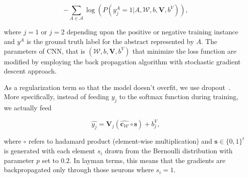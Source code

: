 \[- \sum_{A \in \mathcal{A}} \log(P(y_j^A = 1 | A, \mathcal{W}, b, \mathbf{V}, b^{V})),\]

where $j=1$ or $j=2$ depending upon the positive or negative training instance and $y^A$ is the ground truth label for the abstract represented by $A$. The parameters of CNN, that is $(\mathcal{W}, b, \mathbf{V}, b^{V})$ that minimize the loss function are modified by employing the back propagation algorithm with stochastic gradient descent approach. 

As a regularization term so that the model doesn't overfit, we use dropout~\cite{srivastava2014dropout}. More specifically, instead of feeding $y_j$ to the softmax function during training, we actually feed 

\[ \widehat{y_{j}} = \mathbf{V}_j( \mathbf{\widehat{c_{\mathcal{W}}}} \circ \mathbf{s}) + b^{V}_j,
\]
 
where $\circ$ refers to hadamard product (element-wise multiplication) and $\mathbf{s} \in \{0,1\}^t$ is generated with each element $s_i$ drawn from the Bernoulli distribution with parameter $p$ set to $0.2$. In layman terms, this means that the gradients are backpropagated only through those neurons where $s_i = 1$. 





